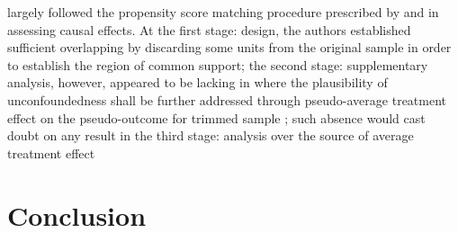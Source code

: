 \textcite{sullivan:2013} largely followed the propensity score matching procedure prescribed by \textcite{imbens:2015b} and \textcite{imbens:2015a} in assessing causal effects. At the first stage: design, the authors established sufficient overlapping by discarding some units from the original sample in order to establish the region of common support; the second stage: supplementary analysis, however, appeared to be lacking in \textcite{sullivan:2013} where the plausibility of unconfoundedness shall be further addressed through pseudo-average treatment effect on the pseudo-outcome for trimmed sample \parencite[see][pp. 383--384]{imbens:2015a}; such absence would cast doubt on any result in the third stage: analysis over the source of average treatment effect

\section{Conclusion}

